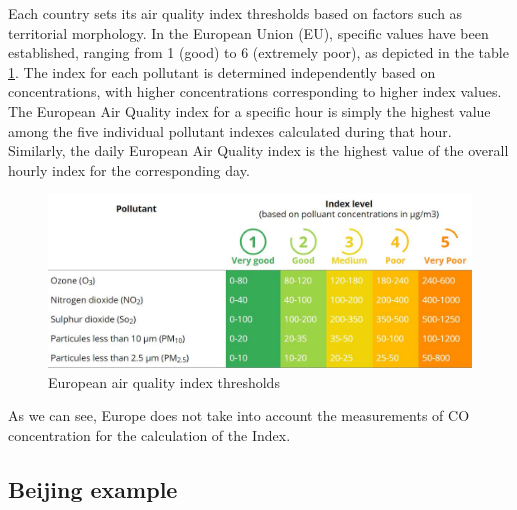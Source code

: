 Each country sets its air quality index thresholds based on factors such as territorial morphology. In the European Union (EU), specific values have been established, ranging from 1 (good) to 6 (extremely poor), as depicted in the table \ref{fig:euaqitable}. The index for each pollutant is determined independently based on concentrations, with higher concentrations corresponding to higher index values. The European Air Quality index for a specific hour is simply the highest value among the five individual pollutant indexes calculated during that hour. Similarly, the daily European Air Quality index is the highest value of the overall hourly index for the corresponding day.
\begin{figure}
    \centering
    \includegraphics[width=1\linewidth]{images/airqualityindexcalc.png}
    \caption{European air quality index thresholds}
    \label{fig:euaqitable}
\end{figure}

As we can see, Europe does not take into account the measurements of CO concentration for the calculation of the Index.

\subsection{Beijing example}


